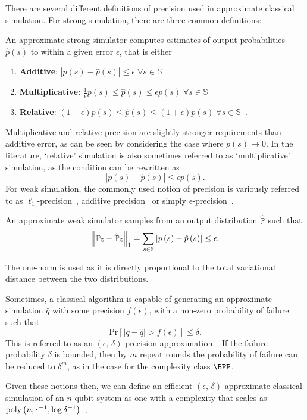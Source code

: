 There are several different definitions of precision used in approximate classical simulation. For strong simulation, there are three common definitions:
\begin{defn}\label{def:approximate_strong}
An approximate strong simulator computes estimates of output probabilities $\hat{p}\left(s\right)$ to within a given error $\epsilon$, that is either
\begin{enumerate}
    \item \textbf{Additive}: $\left|p\left(s\right)-\hat{p}\left(s\right)\right| \leq \epsilon\;\forall s\in\mathbb{S}$~\cite{Pashayan2017}
    \item \textbf{Multiplicative}: $\frac{1}{\epsilon}p\left(s\right)\leq \hat{p}\left(s\right) \leq \epsilon p\left(s\right)\;\forall s\in\mathbb{S}$~\cite{Hangleiter2017}
    \item \textbf{Relative}: $\left(1-\epsilon\right)p\left(s\right) \leq \hat{p}\left(s\right) \leq \left(1+\epsilon\right)p\left(s\right) \;\forall s\in\mathbb{S} $~\cite{Hangleiter2017,Bravyi2016}.
\end{enumerate}
\end{defn}
Multiplicative and relative precision are slightly stronger requirements than additive error, as can be seen by considering the case where $p\left(s\right)\rightarrow 0$. In the literature, `relative' simulation is also sometimes referred to as `multiplicative' simulation, as the condition can be rewritten as~\cite{Pashayan2017}
\[\left|p\left(s\right)-\hat{p}\left(s\right)\right| \leq \epsilon p\left(s\right).\]
For weak simulation, the commonly used notion of precision is variously referred to as $\ell_{1}$-precision~\cite{Bremner2011}, additive precision~\cite{Yoganathan2019} or simply $\epsilon$-precision~\cite{Pashayan2017}.
\begin{defn}\label{def:approximate_weak}
An approximate weak simulator samples from an output distribution $\hat{\mathbb{P}}$ such that
\[ \norm{\mathbb{P}_{\mathbb{S}}-\hat{\mathbb{P}}_{\mathbb{S}}}_{1} = \sum_{s\in \mathbb{S}} \left| p\left(s\right) - \hat{p}\left(s\right)\right| \leq \epsilon.\]
\end{defn}
The one-norm is used as it is directly proportional to the total variational distance between the two distributions.\par
Sometimes, a classical algorithm is capable of generating an approximate simulation $\hat{q}$ with some precision $f\left(\epsilon\right)$, with a non-zero probability of failure such that
\[\text{Pr}\left[\left|q-\hat{q}\right| > f\left(\epsilon\right)\right]\leq \delta.\]
This is referred to as an $\left(\epsilon,\,\delta\right)$-precision approximation~\cite{Pashayan2017}. If the failure probability $\delta$ is bounded, then by $m$ repeat rounds the probability of failure can be reduced to $\delta^{m}$, as in the case for the complexity class $\BPP$.\par
Given these notions then, we can define an efficient $\left(\epsilon,\,\delta\right)$-approximate classical simulation of an $n$ qubit system as one with a complexity that scales as $\text{poly} \left(n, \epsilon^{-1}, \log{\delta^{-1}}\right)$~\cite{Pashayan2017}.
